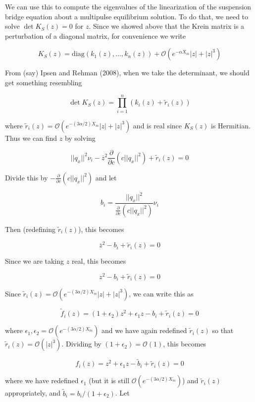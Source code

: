 \documentclass[12pt]{article}
\begin{document}
We can use this to compute the eigenvalues of the linearization of the suspension bridge equation about a multipulse equilibrium solution. To do that, we need to solve $\det K_S(z) = 0$ for $z$. Since we showed above that the Krein matrix is a perturbation of a diagonal matrix, for convenience we write

\[
K_S(z) = \text{diag}(k_1(z), \dots, k_n(z)) + \mathcal{O}(e^{-\alpha X_m}|z| + |z|^3)
\]

From (say) Ipsen and Rehman (2008), when we take the determinant, we should get something resembling

\[
\det K_S(z) = \prod_{i = 1}^n (k_i(z) + \tilde{r}_i(z))
\]

where $\tilde{r}_i(z) = \mathcal{O}(e^{-(3 \alpha/2) X_m}|z| + |z|^3)$ and is real since $K_S(z)$ is Hermitian. Thus we can find $z$ by solving

\[
||q_x||^2 \nu_i
 - \overline{z}^2 \frac{\partial}{\partial c} \left( c||q_x||^2 \right) + \tilde{r}_i(z) = 0
\]

Divide this by $-\frac{\partial}{\partial c} \left( c||q_x||^2 \right)$ and let

\[
b_i = \frac{||q_x||^2}{\frac{\partial}{\partial c} \left( c||q_x||^2 \right)} \nu_i
\]

Then (redefining $\tilde{r}_i(z)$), this becomes

\[
\overline{z}^2 - b_i + \tilde{r}_i(z) = 0
\]

Since we are taking $z$ real, this becomes

\[
z^2 - b_i + \tilde{r}_i(z) = 0
\]

Since $\tilde{r}_i(z) = \mathcal{O}(e^{-(3 \alpha/2) X_m}|z| + |z|^3)$, we can write this as

\begin{equation}\label{fz}
\tilde{f}_i(z) = (1 + \epsilon_2) z^2 + \epsilon_1 z - b_i + \tilde{r}_i(z) = 0
\end{equation}

where $\epsilon_1, \epsilon_2  = \mathcal{O}(e^{-(3 \alpha/2) X_m})$ and we have again redefined $\tilde{r}_i(z)$ so that $\tilde{r}_i(z) = \mathcal{O}(|z|^3)$. Dividing by $(1 + \epsilon_2) = \mathcal{O}(1)$, this becomes

\begin{equation}\label{fz}
f_i(z) = z^2 + \epsilon_1 z - \tilde{b}_i + \tilde{r}_i(z) = 0
\end{equation}

where we have redefined $\epsilon_1$ (but it is still $\mathcal{O}(e^{-(3 \alpha/2) X_m})$) and $\tilde{r}_i(z)$ appropriately, and $\tilde{b}_i = b_i / (1 + \epsilon_2)$. Let
\end{document}
